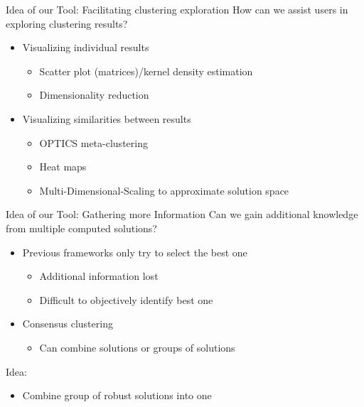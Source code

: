 \documentclass[aspectratio=169]{beamer}
\begin{document}
\begin{frame}{Idea of our Tool: Facilitating clustering exploration}
How can we assist users in exploring clustering results?\newline
	\begin{itemize}
		\item Visualizing individual results
		\begin{itemize}
			\item Scatter plot (matrices)/kernel density estimation
			\item Dimensionality reduction
		\end{itemize}
		\item Visualizing similarities between results
		\begin{itemize}
			\item OPTICS meta-clustering
			\item Heat maps
			\item Multi-Dimensional-Scaling to approximate solution space
		\end{itemize}
	\end{itemize}
\end{frame}

\begin{frame}{Idea of our Tool: Gathering more Information}
Can we gain additional knowledge from multiple computed solutions?\newline
	\begin{itemize}
		\item Previous frameworks only try to select the best one
		\begin{itemize}
			\item Additional information lost
			\item Difficult to objectively identify best one
		\end{itemize}
		\item Consensus clustering
		\begin{itemize}
			\item Can combine solutions or groups of solutions
		\end{itemize}
	\end{itemize}

Idea:
	\begin{itemize}
		\item Combine group of robust solutions into one
	\end{itemize}
\end{frame}
\end{document}
